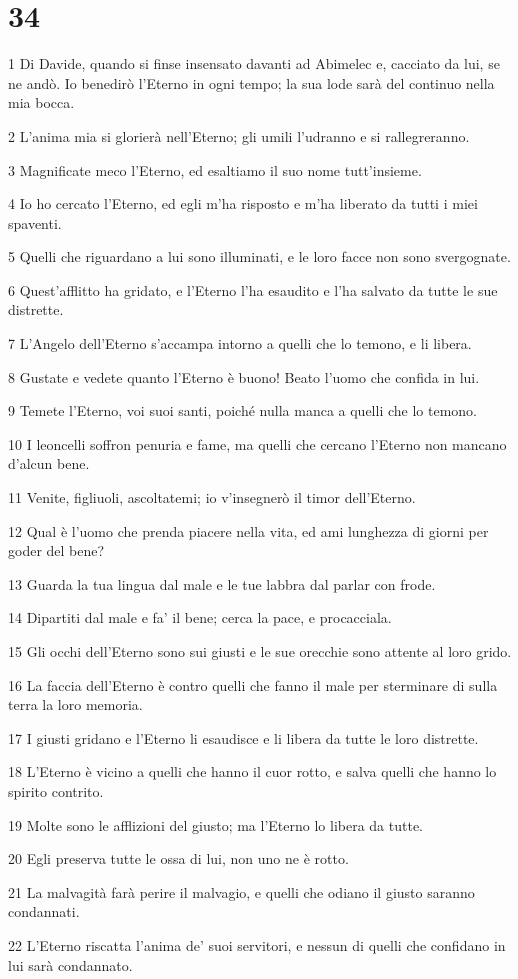 \chapter{34}

\par 1 Di Davide, quando si finse insensato davanti ad Abimelec e, cacciato da lui, se ne andò. Io benedirò l'Eterno in ogni tempo; la sua lode sarà del continuo nella mia bocca.
\par 2 L'anima mia si glorierà nell'Eterno; gli umili l'udranno e si rallegreranno.
\par 3 Magnificate meco l'Eterno, ed esaltiamo il suo nome tutt'insieme.
\par 4 Io ho cercato l'Eterno, ed egli m'ha risposto e m'ha liberato da tutti i miei spaventi.
\par 5 Quelli che riguardano a lui sono illuminati, e le loro facce non sono svergognate.
\par 6 Quest'afflitto ha gridato, e l'Eterno l'ha esaudito e l'ha salvato da tutte le sue distrette.
\par 7 L'Angelo dell'Eterno s'accampa intorno a quelli che lo temono, e li libera.
\par 8 Gustate e vedete quanto l'Eterno è buono! Beato l'uomo che confida in lui.
\par 9 Temete l'Eterno, voi suoi santi, poiché nulla manca a quelli che lo temono.
\par 10 I leoncelli soffron penuria e fame, ma quelli che cercano l'Eterno non mancano d'alcun bene.
\par 11 Venite, figliuoli, ascoltatemi; io v'insegnerò il timor dell'Eterno.
\par 12 Qual è l'uomo che prenda piacere nella vita, ed ami lunghezza di giorni per goder del bene?
\par 13 Guarda la tua lingua dal male e le tue labbra dal parlar con frode.
\par 14 Dipartiti dal male e fa' il bene; cerca la pace, e procacciala.
\par 15 Gli occhi dell'Eterno sono sui giusti e le sue orecchie sono attente al loro grido.
\par 16 La faccia dell'Eterno è contro quelli che fanno il male per sterminare di sulla terra la loro memoria.
\par 17 I giusti gridano e l'Eterno li esaudisce e li libera da tutte le loro distrette.
\par 18 L'Eterno è vicino a quelli che hanno il cuor rotto, e salva quelli che hanno lo spirito contrito.
\par 19 Molte sono le afflizioni del giusto; ma l'Eterno lo libera da tutte.
\par 20 Egli preserva tutte le ossa di lui, non uno ne è rotto.
\par 21 La malvagità farà perire il malvagio, e quelli che odiano il giusto saranno condannati.
\par 22 L'Eterno riscatta l'anima de' suoi servitori, e nessun di quelli che confidano in lui sarà condannato.

